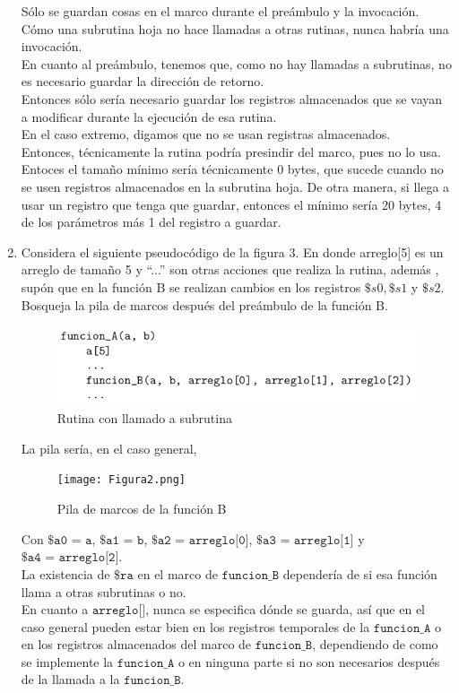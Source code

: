 \documentclass{article}
\begin{document}
\begin{enumerate}
{\begin{enumerate}
{			Sólo se guardan cosas en el marco durante el preámbulo y la 
			invocación.\\
			Cómo una subrutina hoja no hace llamadas a otras rutinas, nunca 
			habría una invocación.\\
			En cuanto al preámbulo, tenemos que, como no hay llamadas a
			subrutinas, no es necesario guardar la dirección de retorno.\\
			Entonces sólo sería necesario guardar los registros almacenados que 
			se vayan a modificar durante la ejecución de esa rutina.\\
			En el caso extremo, digamos que no se usan registras almacenados.\\
			Entonces, técnicamente la rutina podría presindir del marco, pues no
			lo usa. Entoces el tamaño mínimo sería técnicamente 0 bytes, que
			sucede cuando no se usen registros almacenados en la subrutina hoja.
			De otra manera, si llega a usar un registro que tenga que guardar,
			entonces el mínimo sería 20 bytes, 4 de los parámetros más 1 del
			registro a guardar.
			}
		\end{enumerate}
		
	
	}
	
		
	\item{
	Considera el siguiente pseudocódigo de la figura 3. En donde arreglo[5] es un
	arreglo de tamaño 5 y “...” son otras acciones que realiza la rutina, además
	, supón que en la función B se realizan cambios en los registros $\$s0,
	\$s1$ y $\$s2$. Bosqueja la pila de marcos después del preámbulo de la 
	función B.
	
	\begin{figure}[H]
		\centering
		\includegraphics[scale=0.5]{Figura1.png}
		\caption{Rutina con llamado a subrutina}
	\end{figure}

	La pila sería, en el caso general,
	
	\begin{figure}[H]
		\centering
		\texttt{[image: Figura2.png]}
		\caption{Pila de marcos de la función B}
	\end{figure}
	}
	Con $\texttt{\$a0 = a}$, $\texttt{\$a1 = b}$, $\texttt{\$a2 = arreglo[0]}$,
	$\texttt{\$a3 = arreglo[1]}$ y $\texttt{\$a4 = arreglo[2]}$.\\
	La existencia de $\texttt{\$ra}$ en el marco de $\texttt{funcion\_B}$
	dependería de si esa función llama a otras subrutinas o no.\\
	En cuanto a $\texttt{arreglo[]}$, nunca se especifica dónde se guarda, así 
	que en el caso general pueden estar bien en los registros temporales de la 
	$\texttt{funcion\_A}$ o en los registros almacenados del marco de 
	$\texttt{funcion\_B}$, dependiendo de como se implemente la 
	$\texttt{funcion\_A}$ o en ninguna parte si no son necesarios después de la
	llamada a la $\texttt{funcion\_B}$.
    \end{enumerate}
\end{document}

